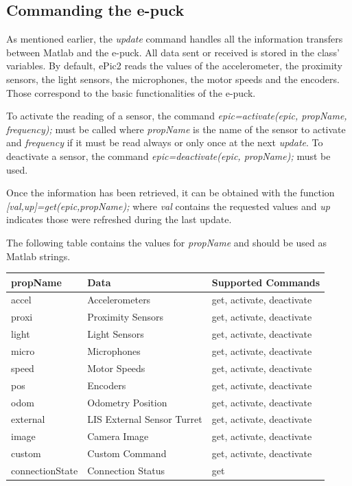 \documentclass[11pt,oneside,english,a4paper]{article}
\begin{document}
\subsection{Commanding the e-puck}
As mentioned earlier, the \emph{update} command handles all the information transfers between Matlab and the e-puck. All data sent or received is stored in the class' variables. By default, ePic2 reads the values of the accelerometer, the proximity sensors, the light sensors, the microphones, the motor speeds and the encoders. Those correspond to the basic functionalities of the e-puck.
\par To activate the reading of a sensor, the command \emph{epic=activate(epic, propName, frequency);} must be called where \emph{propName} is the name of the sensor to activate and \emph{frequency} if it must be read always or only once at the next \emph{update}. To deactivate a sensor, the command \emph{epic=deactivate(epic, propName);} must be used.
\par Once the information has been retrieved, it can be obtained with the function \newline \emph{[val,up]=get(epic,propName);} where \emph{val} contains the requested values and \emph{up} indicates those were refreshed during the last update.
\par The following table contains the values for \emph{propName} and should be used as Matlab strings.
\setlongtables
\begin{longtable}{|l|l|p{4.8cm}|}
\hline
propName & Data & Supported Commands\\
\hline
accel & Accelerometers & get, activate, deactivate\\
\hline
proxi & Proximity Sensors & get, activate, deactivate\\
\hline
light & Light Sensors & get, activate, deactivate\\
\hline
micro & Microphones & get, activate, deactivate\\
\hline
speed & Motor Speeds & get, activate, deactivate\\
\hline
pos & Encoders & get, activate, deactivate\\
\hline
odom & Odometry Position & get, activate, deactivate\\
\hline
external & LIS External Sensor Turret & get, activate, deactivate\\
\hline
image & Camera Image & get, activate, deactivate\\
\hline
custom & Custom Command & get, activate, deactivate\\
\hline
connectionState & Connection Status & get\\
\hline
\end{longtable}
\end{document}
